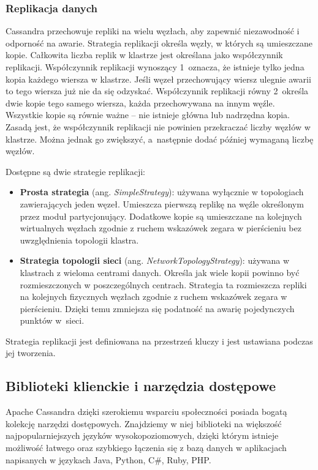 \subsubsection{Replikacja danych}

Cassandra przechowuje repliki na wielu węzłach, aby zapewnić niezawodność i odporność na awarie.
Strategia replikacji określa węzły, w których są umieszczane kopie.
Całkowita liczba replik w klastrze jest określana jako współczynnik replikacji.
Współczynnik replikacji wynoszący 1~oznacza, że istnieje tylko jedna kopia każdego wiersza w klastrze.
Jeśli węzeł przechowujący wiersz ulegnie awarii to tego wiersza już nie da się odzyskać.
Współczynnik replikacji równy 2~określa dwie kopie tego samego wiersza, każda przechowywana na innym węźle.
Wszystkie kopie są równie ważne -- nie istnieje główna lub nadrzędna kopia.
Zasadą jest, że współczynnik replikacji nie powinien przekraczać liczby węzłów w klastrze.
Można jednak go zwiększyć, a~następnie dodać później wymaganą liczbę węzłów.

Dostępne są dwie strategie replikacji:
\begin{itemize}
    \item \textbf{Prosta strategia} (ang. \textit{SimpleStrategy}): używana wyłącznie w topologiach zawierających jeden węzeł.
    Umieszcza pierwszą replikę na węźle określonym przez moduł partycjonujący.
    Dodatkowe kopie są umieszczane na kolejnych wirtualnych węzłach zgodnie z ruchem wskazówek zegara w pierścieniu bez uwzględnienia topologii klastra.
    \item \textbf{Strategia topologii sieci} (ang. \textit{NetworkTopologyStrategy}): używana w klastrach z wieloma centrami danych.
    Określa jak wiele kopii powinno być rozmieszczonych w poszczególnych centrach.
    Strategia ta rozmieszcza repliki na kolejnych fizycznych węzłach zgodnie z ruchem wskazówek zegara w pierścieniu.
    Dzięki temu zmniejsza się podatność na awarię pojedynczych punktów w~sieci.
\end{itemize}

Strategia replikacji jest definiowana na przestrzeń kluczy i jest ustawiana podczas jej tworzenia.

\subsection{Biblioteki klienckie i narzędzia dostępowe}

Apache Cassandra dzięki szerokiemu wsparciu społeczności posiada bogatą kolekcję narzędzi dostępowych. 
Znajdziemy w niej biblioteki na większość najpopularniejszych języków wysokopoziomowych, dzięki którym istnieje możliwość łatwego oraz szybkiego łączenia się z bazą danych w aplikacjach napisanych w językach Java, Python, C\#, Ruby, PHP.

